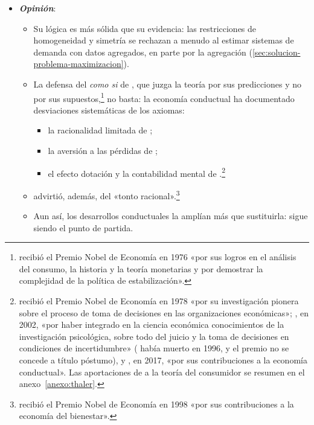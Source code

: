 \documentclass[11pt]{article}
\begin{document}
\begin{itemize}
\item \textbf{\emph{Opinión}}:
  \begin{itemize}
  \item Su lógica es más sólida que su evidencia: las restricciones de homogeneidad y simetría se rechazan a menudo al estimar sistemas de demanda con datos agregados, en parte por la agregación (\ref{sec:solucion-problema-maximizacion})\nocite{DeatonMuellbauer1980AIDS}.
  \item La defensa del \emph{como si} de \textcite{Friedman1953Methodology}, que juzga la teoría por sus predicciones y no por sus supuestos,\footnote{ recibió el Premio Nobel de Economía en 1976 «por sus logros en el análisis del consumo, la historia y la teoría monetarias y por demostrar la complejidad de la política de estabilización»\nocite{Nobel1976Friedman}.} no basta: la economía conductual ha documentado desviaciones sistemáticas de los axiomas:
    \begin{itemize}
    \item la racionalidad limitada de \textcite{Simon1955Behavioral};
    \item la aversión a las pérdidas de \textcite{KahnemanTversky1979Prospect} ;
    \item el efecto dotación y la contabilidad mental de \textcite{Thaler1980Positive,Thaler1985Mental}.\footnote{ recibió el Premio Nobel de Economía en 1978 «por su investigación pionera sobre el proceso de toma de decisiones en las organizaciones económicas»\nocite{Nobel1978Simon}; , en 2002, «por haber integrado en la ciencia económica conocimientos de la investigación psicológica, sobre todo del juicio y la toma de decisiones en condiciones de incertidumbre»\nocite{Nobel2002Kahneman} ( había muerto en 1996, y el premio no se concede a título póstumo), y , en 2017, «por sus contribuciones a la economía conductual»\nocite{Nobel2017Thaler}. Las aportaciones de  a la teoría del consumidor se resumen en el anexo~\ref{anexo:thaler}.}
    \end{itemize}
  \item \textcite{Sen1977Rational} advirtió, además, del «tonto racional».\footnote{ recibió el Premio Nobel de Economía en 1998 «por sus contribuciones a la economía del bienestar»\nocite{Nobel1998Sen}.}
  \item Aun así, los desarrollos conductuales la amplían más que sustituirla: sigue siendo el punto de partida.
  \end{itemize}


\end{itemize}
\end{document}

